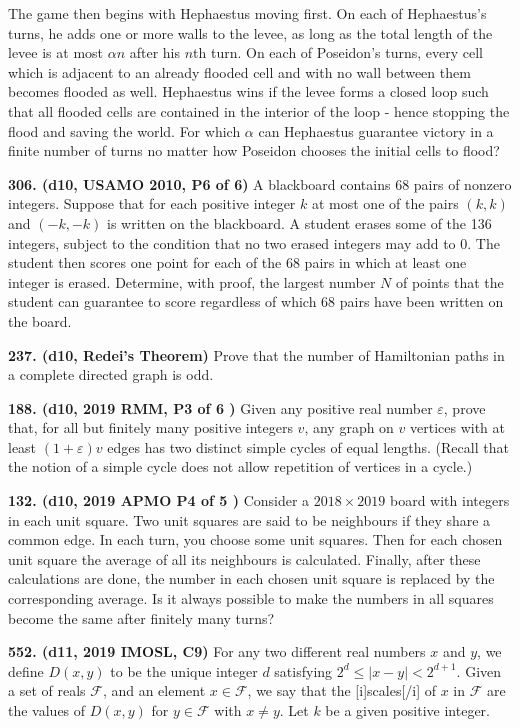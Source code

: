 \documentclass{article}
\begin{document}
The game then begins with Hephaestus moving first. On each of Hephaestus's turns, he adds one or more walls to the levee, as long as the total length of the levee is at most $\alpha n$ after his $n$th turn. On each of Poseidon's turns, every cell which is adjacent to an already flooded cell and with no wall between them becomes flooded as well. Hephaestus wins if the levee forms a closed loop such that all flooded cells are contained in the interior of the loop - hence stopping the flood and saving the world. For which $\alpha$ can Hephaestus guarantee victory in a finite number of turns no matter how Poseidon chooses the initial cells to flood?

\textbf{306. (\color{red}d10\color{black}, USAMO 2010, P6 of 6)} A blackboard contains 68 pairs of nonzero integers. Suppose that for each positive integer $k$ at most one of the pairs $(k, k)$ and $(-k, -k)$ is written on the blackboard. A student erases some of the 136 integers, subject to the condition that no two erased integers may add to 0. The student then scores one point for each of the 68 pairs in which at least one integer is erased. Determine, with proof, the largest number $N$ of points that the student can guarantee to score regardless of which 68 pairs have been written on the board.

\textbf{237. (\color{red}d10\color{black}, Redei's Theorem)} Prove that the number of Hamiltonian paths in a complete directed graph is odd.

\textbf{188. (\color{red}d10\color{black}, 2019 RMM, P3 of 6 )} Given any positive real number $\varepsilon$, prove that, for all but finitely many positive integers $v$, any graph on $v$ vertices with at least  $(1+\varepsilon)v$ edges has two distinct simple cycles of equal lengths.
(Recall that the notion of a simple cycle does not allow repetition of vertices in a cycle.)

\textbf{132. (\color{red}d10\color{black}, 2019 APMO P4 of 5   )} Consider a $2018 \times 2019$ board with integers in each unit square. Two unit squares are said to be neighbours if they share a common edge. In each turn, you choose some unit squares. Then for each chosen unit square the average of all its neighbours is calculated. Finally, after these calculations are done, the number in each chosen unit square is replaced by the corresponding average. Is it always possible to make the numbers in all squares become the same after finitely many turns?

\textbf{552. (\color{red}d11\color{black}, 2019 IMOSL, C9)} For any two different real numbers $x$ and $y$, we define $D(x,y)$ to be the unique integer $d$ satisfying $2^d\le |x-y| < 2^{d+1}$. Given a set of reals $\mathcal F$, and an element $x\in \mathcal F$, we say that the [i]scales[/i] of $x$ in $\mathcal F$ are the values of $D(x,y)$ for $y\in\mathcal F$ with $x\neq y$. Let $k$ be a given positive integer.
\end{document}

